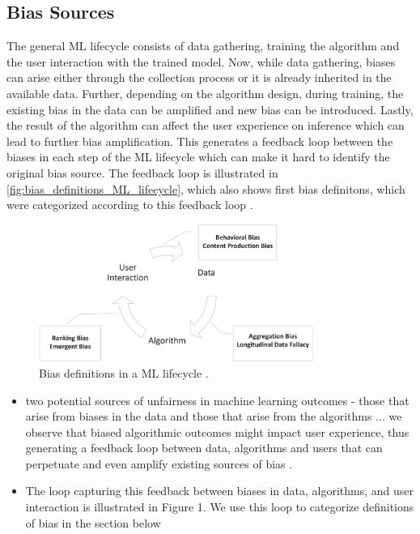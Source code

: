 \begin{refsection}
			\subsection{Bias Sources}
		The general \gls{ML} lifecycle consists of data gathering, training the algorithm and the user interaction with the trained model. Now, while data gathering, biases can arise either through the collection process or it is already inherited in the available data. Further, depending on the algorithm design, during training, the existing bias in the data can be amplified and new bias can be introduced. Lastly, the result of the algorithm can affect the user experience on inference which can lead to further bias amplification. This generates a feedback loop between the biases in each step of the \gls{ML} lifecycle which can make it hard to identify the original bias source. The feedback loop is illustrated in \autoref{fig:bias_definitions_ML_lifecycle}, which also shows first bias definitons, which were categorized according to this feedback loop \autocite{Mehrabi_2021}.
		
		\begin{figure}[H]
			\centering
			\includegraphics[width=0.8\textwidth]{figures/BiasCategoriesInMLLifecycle.png}
			\caption{Bias definitions in a \gls{ML} lifecycle \autocite{Mehrabi_2021}.}
			\label{fig:bias_definitions_ML_lifecycle}
		\end{figure}
		
		\rawcitationusedstart
		\begin{itemize}
			\item two potential sources of unfairness in machine learning outcomes - those that arise from biases in the data and those that arise from the algorithms ... we observe that biased algorithmic outcomes might impact user experience, thus generating a feedback loop between data, algorithms and users that can perpetuate and even amplify existing sources of bias \autocite{Mehrabi_2021}.
			\item The loop capturing this feedback between biases in data, algorithms, and user interaction is illustrated in Figure 1. We use this loop to categorize definitions of bias in the section below \autocite{Mehrabi_2021}
		\end{itemize}
		\rawcitationusedend
		

\end{refsection}
